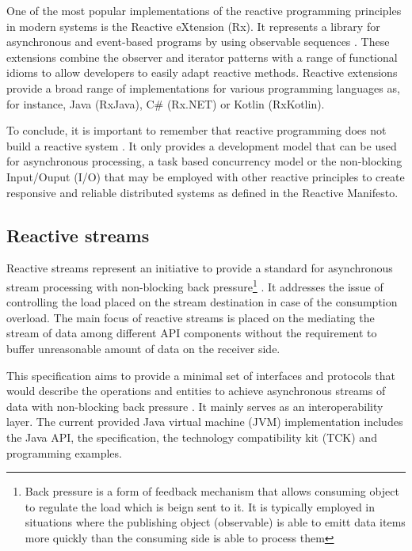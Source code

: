 \documentclass[oneside,
  digital, %
  table,   %
  lof,     %
  lot,     %
]{fithesis3}
\begin{document}
One of the most popular implementations of the reactive programming principles in modern systems is the Reactive eXtension (Rx). It represents a library for asynchronous and event-based programs by using observable sequences \cite{rxJava}. These extensions combine the observer and iterator patterns with a range of functional idioms to allow developers to easily adapt reactive methods. Reactive extensions provide a broad range of implementations for various programming languages as, for instance, Java (RxJava), C\# (Rx.NET) or Kotlin (RxKotlin). 

To conclude, it is important to remember that reactive programming does not build a reactive system \cite{5thingsAboutRP_RHDev}. It only provides a development model that can be used for asynchronous processing, a task based concurrency model or the non-blocking Input/Ouput (I/O) that may be employed with other reactive principles to create responsive and reliable distributed systems as defined in the Reactive Manifesto.

\subsection{Reactive streams}

Reactive streams represent an initiative to provide a standard for asynchronous stream processing with non-blocking back pressure\footnote{Back pressure is a form of feedback mechanism that allows consuming object to regulate the load which is beign sent to it. It is typically employed in situations where the publishing object (observable) is able to emitt data items more quickly than the consuming side is able to process them} \cite{reactive_streams}. It addresses the issue of controlling the load placed on the stream destination in case of the consumption overload. The main focus of reactive streams is placed on the mediating the stream of data among different API components without the requirement to buffer unreasonable amount of data on the receiver side. 

This specification aims to provide a minimal set of interfaces and protocols that would describe the operations and entities to achieve asynchronous streams of data with non-blocking back pressure \cite{building_reactive_ms_in_java}. It mainly serves as an interoperability layer. The current provided Java virtual machine (JVM) implementation includes the Java API, the specification, the technology compatibility kit (TCK) and programming examples. 
\end{document}

